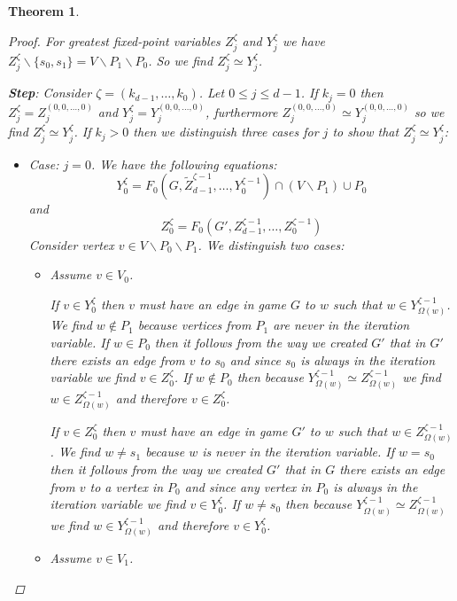 \documentclass[]{article}
\newtheorem{theorem}{Theorem}[section]
\begin{document}
\begin{theorem}
\begin{proof}
			For greatest fixed-point variables $Z_j^\zeta$ and $Y_j^{\zeta}$ we have $Z_j^\zeta \backslash \{s_0,s_1\} = V \backslash P_1 \backslash P_0$. So we find $Z_j^\zeta \simeq Y_j^{\zeta}$.
			
			\textbf{Step}: Consider $\zeta = (k_{d-1},\dots,k_0)$. Let $0 \leq j \leq d-1$. If $k_j = 0$ then $Z_j^\zeta = Z_j^{(0,0,\dots,0)}$ and $Y_j^{\zeta} = Y_j^{(0,0,\dots,0)}$, furthermore $Z_j^{(0,0,\dots,0)}\simeq Y_j^{(0,0,\dots,0)}$ so we find $Z_j^{\zeta} \simeq Y_j^{\zeta}$.
			If $k_j > 0$ then we distinguish three cases for $j$ to show that $Z_j^{\zeta} \simeq Y_j^{\zeta}$:
			\begin{itemize}
				\item Case: $j=0$. We have the following equations:
				\[ Y_0^{\zeta} = F_0(G,\tilde{Z}_{d-1}^{\zeta-1},\dots,Y_0^{\zeta-1}) \cap (V\backslash P_1) \cup P_0 \]
				and
				\[ Z_0^{\zeta} = F_0(G',Z_{d-1}^{\zeta-1},\dots,Z_0^{\zeta-1}) \]
				Consider vertex $v \in V\backslash P_0 \backslash P_1$. We distinguish two cases:
				\begin{itemize}
					\item Assume $v \in V_0$.
					
					If $v \in Y_0^{\zeta}$ then $v$ must have an edge in game $G$ to $w$ such that $w\in Y^{\zeta-1}_{\Omega(w)}$. We find $w \notin P_1$ because vertices from $P_1$ are never in the iteration variable. If $w \in P_0$ then it follows from the way we created $G'$ that in $G'$ there exists an edge from $v$ to $s_0$ and since $s_0$ is always in the iteration variable we find $v \in Z_0^{\zeta}$. If $w \notin P_0$ then because $Y^{\zeta-1}_{\Omega(w)} \simeq Z^{\zeta-1}_{\Omega(w)}$ we find $w \in Z^{\zeta-1}_{\Omega(w)}$ and therefore $v \in Z_0^{\zeta}$.
					
					If $v \in Z_0^{\zeta}$ then $v$ must have an edge in game $G'$ to $w$ such that $w\in Z^{\zeta-1}_{\Omega(w)}$. We find $w \neq s_1$ because $w$ is never in the iteration variable. If $w = s_0$ then it follows from the way we created $G'$ that in $G$ there exists an edge from $v$ to a vertex in $P_0$ and since any vertex in $P_0$ is always in the iteration variable we find $v \in Y_0^{\zeta}$. If $w \neq s_0$ then because $Y^{\zeta-1}_{\Omega(w)} \simeq Z^{\zeta-1}_{\Omega(w)}$ we find $w \in Y^{\zeta-1}_{\Omega(w)}$ and therefore $v \in Y_0^{\zeta}$.
					\item Assume $v \in V_1$.
					

\end{itemize}
\end{itemize}
\end{proof}
\end{theorem}
\end{document}
